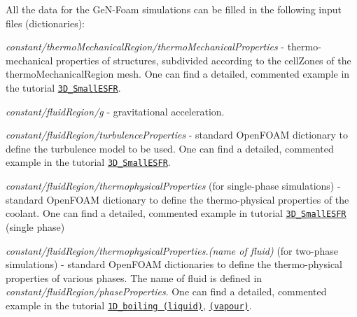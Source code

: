 All the data for the Ge\+N-\/\+Foam simulations can be filled in the following input files (dictionaries)\+:
\begin{DoxyItemize}
\item {\itshape constant/thermo\+Mechanical\+Region/thermo\+Mechanical\+Properties} -\/ thermo-\/mechanical properties of structures, subdivided according to the cell\+Zones of the thermo\+Mechanical\+Region mesh. One can find a detailed, commented example in the tutorial \href{https://gitlab.com/foam-for-nuclear/GeN-Foam/-/tree/master/Tutorials/3D_SmallESFR/rootCase/constant/thermoMechanicalRegion/thermoMechanicalProperties}{\tt 3\+D\+\_\+\+Small\+E\+S\+FR}.
\item {\itshape constant/fluid\+Region/g} -\/ gravitational acceleration.
\item {\itshape constant/fluid\+Region/turbulence\+Properties} -\/ standard Open\+F\+O\+AM dictionary to define the turbulence model to be used. One can find a detailed, commented example in the tutorial \href{https://gitlab.com/foam-for-nuclear/GeN-Foam/-/tree/master/Tutorials/3D_SmallESFR/rootCase/constant/fluidRegion/turbulenceProperties}{\tt 3\+D\+\_\+\+Small\+E\+S\+FR}.
\item {\itshape constant/fluid\+Region/thermophysical\+Properties} (for single-\/phase simulations) -\/ standard Open\+F\+O\+AM dictionary to define the thermo-\/physical properties of the coolant. One can find a detailed, commented example in tutorial \href{https://gitlab.com/foam-for-nuclear/GeN-Foam/-/tree/master/Tutorials/3D_SmallESFR/rootCase/constant/fluidRegion/thermophysicalProperties}{\tt 3\+D\+\_\+\+Small\+E\+S\+FR} (single phase)
\item {\itshape constant/fluid\+Region/thermophysical\+Properties.(name of fluid)} (for two-\/phase simulations) -\/ standard Open\+F\+O\+AM dictionaries to define the thermo-\/physical properties of various phases. The name of fluid is defined in {\itshape constant/fluid\+Region/phase\+Properties}. One can find a detailed, commented example in the tutorial \href{https://gitlab.com/foam-for-nuclear/GeN-Foam/-/tree/master/Tutorials/1D_boiling/constant/fluidRegion/thermophysicalProperties.liquid}{\tt 1\+D\+\_\+boiling (liquid)}, \href{https://gitlab.com/foam-for-nuclear/GeN-Foam/-/tree/master/Tutorials/1D_boiling/constant/fluidRegion/thermophysicalProperties.vapour}{\tt (vapour)}.

\end{DoxyItemize}
